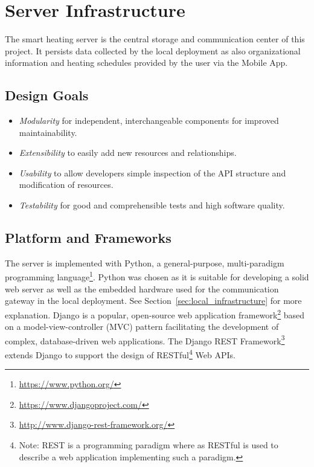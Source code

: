 
\section{Server Infrastructure}
\label{sec:server_infrastructure}

The smart heating server is the central storage and communication center of this project.
It persists data collected by the local deployment as also organizational information and heating schedules provided by the user via the Mobile App.

\subsection{Design Goals}
\label{sec:server_infrastructure_design_goals}

\begin{itemize}
\item \emph{Modularity} for independent, interchangeable components for improved maintainability.
\item \emph{Extensibility} to easily add new resources and relationships.
\item \emph{Usability} to allow developers simple inspection of the API structure and modification of resources.
\item \emph{Testability} for good and comprehensible tests and high software quality.
\end{itemize}

\subsection{Platform and Frameworks}
\label{sec:server_infrastructure_platform_and_frameworks}

The server is implemented with Python, a general-purpose, multi-paradigm programming language\footnote{\url{https://www.python.org/}}.
Python was chosen as it is suitable for developing a solid web server as well as the embedded hardware used for the communication gateway in the local deployment. See Section~\ref{sec:local_infrastructure} for more explanation.
Django is a popular, open-source web application framework\footnote{\url{https://www.djangoproject.com/}} based on a model-view-controller (MVC) pattern facilitating the development of complex, database-driven web applications.
The Django REST Framework\footnote{\url{http://www.django-rest-framework.org/}} extends Django to support the design of RESTful\footnote{Note: REST is a programming paradigm where as RESTful is used to describe a web application implementing such a paradigm.} Web APIs.


